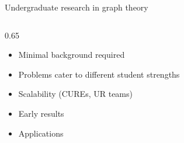 \documentclass{beamer}
\theoremstyle{definition}
\begin{document}
\begin{frame}
\begin{center}
\begin{figure}


\label{fig:complete}

\end{figure}
\end{center}
\end{frame}

\begin{frame}{Undergraduate research in graph theory}
    \begin{columns}
        \begin{column}{0.65\textwidth}
            \begin{itemize}
                \item Minimal background required
                \item Problems cater to different student strengths
                \item Scalability (CUREs, UR teams)
                \item Early results
                \item Applications
            \end{itemize}
        \end{column}
    \end{columns}
\end{frame}
\end{document}
